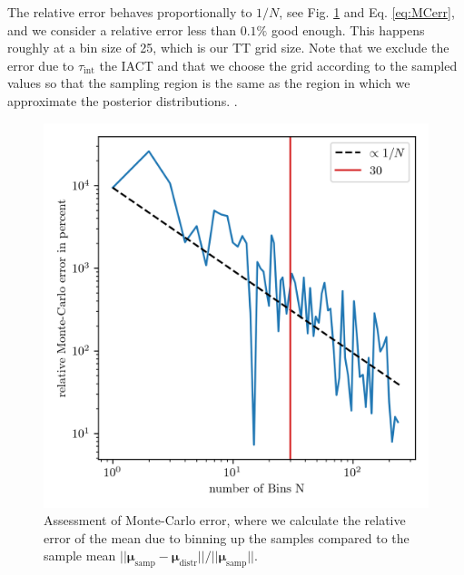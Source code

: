 The relative error behaves proportionally to $1/N$, see Fig. \ref{fig:MCError} and Eq. \ref{eq:MCerr}, and we consider a relative error less than $0.1\%$ good enough.
This happens roughly at a bin size of 25, which is our TT grid size.
Note that we exclude the error due to $\tau_{\text{int}}$ the IACT and that we choose the grid according to the sampled values so that the sampling region is the same as the region in which we approximate the posterior distributions.
.\begin{figure}[ht!]
	\centering
	\includegraphics{MeanAssPT.png}
	\caption[Assessment of Monte-Carlo error.]{Assessment of Monte-Carlo error, where we calculate the relative error of the mean due to binning up the samples compared to the sample mean $||\bm{\mu}_{\text{samp}} -\bm{\mu}_{\text{distr}} ||/ || \bm{\mu}_{\text{samp}}||$.}
	\label{fig:MCError}
\end{figure}


